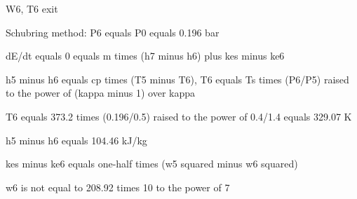 W6, T6 exit

Schubring method: P6 equals P0 equals 0.196 bar

dE/dt equals 0 equals m times (h7 minus h6) plus kes minus ke6

h5 minus h6 equals cp times (T5 minus T6), T6 equals Ts times (P6/P5) raised to the power of (kappa minus 1) over kappa

T6 equals 373.2 times (0.196/0.5) raised to the power of 0.4/1.4 equals 329.07 K

h5 minus h6 equals 104.46 kJ/kg

kes minus ke6 equals one-half times (w5 squared minus w6 squared)

w6 is not equal to 208.92 times 10 to the power of 7